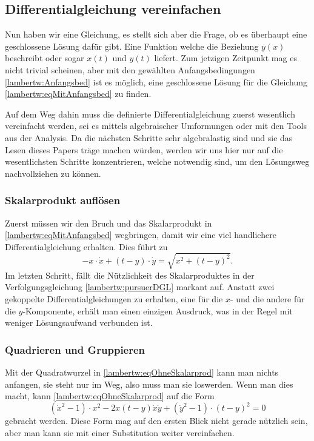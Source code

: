 \subsection{Differentialgleichung vereinfachen
	\label{lambertw:subsection:DGLvereinfach}}
Nun haben wir eine Gleichung, es stellt sich aber die Frage, ob es überhaupt eine geschlossene Lösung dafür gibt. Eine Funktion welche die Beziehung \(y(x)\) beschreibt oder sogar \(x(t)\) und \(y(t)\) liefert. Zum jetzigen Zeitpunkt mag es nicht trivial scheinen, aber mit den gewählten Anfangsbedingungen \eqref{lambertw:Anfangsbed} ist es möglich, eine geschlossene Lösung für die Gleichung \eqref{lambertw:eqMitAnfangsbed} zu finden.

Auf dem Weg dahin muss die definierte Differentialgleichung zuerst wesentlich vereinfacht werden, sei es mittels algebraischer Umformungen oder mit den Tools aus der Analysis. Da die nächsten Schritte sehr algebralastig sind und sie das Lesen dieses Papers träge machen würden, werden wir uns hier nur auf die wesentlichsten Schritte konzentrieren, welche notwendig sind, um den Lösungsweg nachvollziehen zu können.

\subsubsection{Skalarprodukt auflösen
	\label{lambertw:subsubsection:SkalProdAufl}}
Zuerst müssen wir den Bruch und das Skalarprodukt in \eqref{lambertw:eqMitAnfangsbed} wegbringen, damit wir eine viel handlichere Differentialgleichung erhalten. Dies führt zu
\begin{equation}
	-x \cdot \dot{x} + (t-y) \cdot \dot{y}
	= \sqrt{x^2 + (t-y)^2}.
	\label{lambertw:eqOhneSkalarprod}
\end{equation}
Im letzten Schritt, fällt die Nützlichkeit des Skalarproduktes in der Verfolgungsgleichung \eqref{lambertw:pursuerDGL} markant auf. Anstatt zwei gekoppelte Differentialgleichungen zu erhalten, eine für die \(x\)- und die andere für die \(y\)-Komponente, erhält man einen einzigen Ausdruck, was in der Regel mit weniger Lösungsaufwand verbunden ist.

\subsubsection{Quadrieren und Gruppieren
	\label{lambertw:subsubsection:QuadUndGrup}}
Mit der Quadratwurzel in \eqref{lambertw:eqOhneSkalarprod} kann man nichts anfangen, sie steht nur im Weg, also muss man sie loswerden. Wenn man dies macht, kann \eqref{lambertw:eqOhneSkalarprod} auf die Form  
\begin{equation}
	(\dot{x}^2-1) \cdot x^2 -2x (t-y) \dot{x}\dot{y} + (\dot{y}^2-1) \cdot (t-y)^2
	=0
	\label{lambertw:eqOhneWurzel}
\end{equation}
gebracht werden.
Diese Form mag auf den ersten Blick nicht gerade nützlich sein, aber man kann sie mit einer Substitution weiter vereinfachen.

